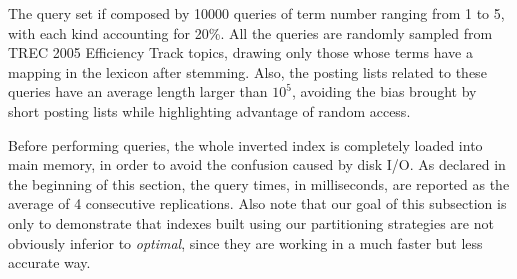 \documentclass[runningheads]{comsis2}
\begin{document}
The query set if composed by 10000 queries of term number ranging from 1 to 5, with each kind accounting for 20\%.
All the queries are randomly sampled from TREC 2005 Efficiency Track topics, drawing only those whose terms have a mapping in the lexicon after stemming.
Also, the posting lists related to these queries have an average length larger than $ 10^5 $, avoiding the bias brought by short posting lists while highlighting advantage of random access.

Before performing queries, the whole inverted index is completely loaded into main memory, in order to avoid the confusion caused by disk I/O.
As declared in the beginning of this section, the query times, in milliseconds, are reported as the average of 4 consecutive replications.
Also note that our goal of this subsection is only to demonstrate that indexes built using our partitioning strategies are not obviously inferior to \textit{optimal}, since they are working in a much faster but less accurate way.
\end{document}
